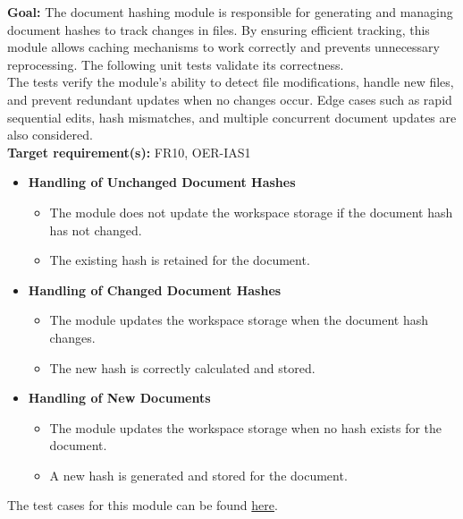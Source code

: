 \documentclass[12pt, titlepage]{article}
\begin{document}
\begin{enumerate}[label={\bf \textcolor{Maroon}{test-SRT-\arabic*}}, wide=0pt, font=\itshape]
\textbf{Goal:} The document hashing module is responsible for generating and managing document hashes to track changes in files. By ensuring efficient tracking, this module allows caching mechanisms to work correctly and prevents unnecessary reprocessing. The following unit tests validate its correctness.\\

\noindent The tests verify the module’s ability to detect file modifications, handle new files, and prevent redundant updates when no changes occur. Edge cases such as rapid sequential edits, hash mismatches, and multiple concurrent document updates are also considered.\\

\noindent\textbf{Target requirement(s):} FR10, OER-IAS1~\cite{SRS} \\

\begin{itemize}
    \item \textbf{Handling of Unchanged Document Hashes}
    \begin{itemize}
        \item The module does not update the workspace storage if the document hash has not changed.
        \item The existing hash is retained for the document.
    \end{itemize}

    \item \textbf{Handling of Changed Document Hashes}
    \begin{itemize}
        \item The module updates the workspace storage when the document hash changes.
        \item The new hash is correctly calculated and stored.
    \end{itemize}

    \item \textbf{Handling of New Documents}
    \begin{itemize}
        \item The module updates the workspace storage when no hash exists for the document.
        \item A new hash is generated and stored for the document.
    \end{itemize}
\end{itemize}

\noindent The test cases for this module can be found \href{https://github.com/ssm-lab/capstone--sco-vs-code-plugin/blob/plugin-multi-file/test/utils/hashDocs.test.ts}{here}.



\end{enumerate}
\end{document}
